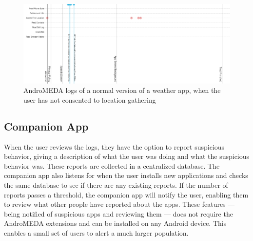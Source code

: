 \documentclass{acm_proc_article-sp}
\begin{document}
\begin{figure}[h]
\begin{center}
\includegraphics[width=1.0\columnwidth]{figs/AndroMEDA_Weather_Notmalware_Nolocation}
\caption{AndroMEDA logs of a normal version of a weather app, when the user has not consented to location gathering }
\label{fig:spyware_logs_nonmalware_noloc}
\end{center}
\end{figure}


\subsection{Companion App}
When the user reviews the logs, they have the option to report suspicious behavior, giving a description of what the user was doing and what the suspicious behavior was. These reports are collected in a centralized database. The companion app also listens for when the user installs new applications and checks the same database to see if there are any existing reports. If the number of reports passes a threshold, the companion app will notify the user, enabling them to review what other people have reported about the apps. These features --- being notified of suspicious apps and reviewing them --- does not require the AndroMEDA extensions and can be installed on any Android device. This enables a small set of users to alert a much larger population.
\end{document}
